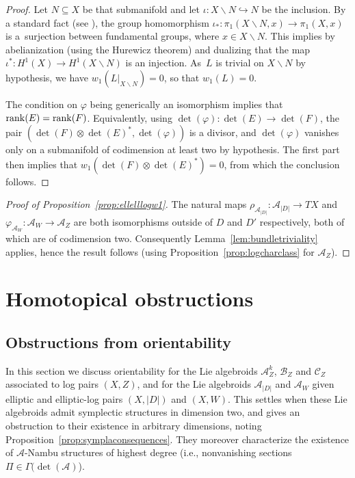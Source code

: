 \documentclass[10pt,a4paper]{amsart}
\numberwithin{equation}{section}
\begin{document}
\begin{proof} Let $N \subseteq X$ be that submanifold and let $\iota\colon X\backslash N \hookrightarrow N$ be the inclusion. By a standard fact (see \cite[Theorem~2.3, p.~146]{Godbillon71}), the group homomorphism $\iota_*\colon \pi_1(X\backslash N,x) \to \pi_1(X,x)$ is a~surjection between fundamental groups, where $x \in X \backslash N$. This implies by abelianization (using the Hurewicz theorem) and dualizing that the map $\iota^*\colon H^1(X) \to H^1(X\backslash N)$ is an injection. As~$L$ is trivial on $X \backslash N$ by hypothesis, we have $w_1(L|_{X\backslash N}) = 0$, so that $w_1(L) = 0$.

The condition on $\varphi$ being generically an isomorphism implies that ${\rm rank}(E) = {\rm rank}(F)$. Equivalently, using $\det(\varphi)\colon \det(E) \to \det(F)$, the pair $(\det(F) \otimes \det(E)^*, \det(\varphi))$ is a divisor, and $\det(\varphi)$ vanishes only on a submanifold of codimension at least two by hypothesis. The first part then implies that $w_1(\det(F) \otimes \det(E)^*) = 0$, from which the conclusion follows.
\end{proof}

\begin{proof}[Proof of Proposition~\ref{prop:ellelllogw1}] The natural maps $\rho_{\mathcal{A}_{|D|}}\colon \mathcal{A}_{|D|} \to TX$ and $\varphi_{\mathcal{A}_W}\colon \mathcal{A}_W \to \mathcal{A}_Z$ are both isomorphisms outside of $D$ and $D'$ respectively, both of which are of codimension two. Consequently Lemma~\ref{lem:bundletriviality} applies, hence the result follows (using Proposition~\ref{prop:logcharclass} for $\mathcal{A}_Z$).
\end{proof}

\section{Homotopical obstructions}

\subsection{Obstructions from orientability}\label{sec:existanambu}

In this section we discuss orientability for the Lie algebroids $\mathcal{A}_Z^k$, $\mathcal{B}_Z$ and $\mathcal{C}_Z$ associated to log pairs $(X,Z)$, and for the Lie algebroids $\mathcal{A}_{|D|}$ and $\mathcal{A}_W$ given elliptic and elliptic-log pairs $(X,|D|)$ and $(X,W)$. This settles when these Lie algebroids admit symplectic structures in dimension two, and gives an obstruction to their existence in arbitrary dimensions, noting Proposition~\ref{prop:symplaconsequences}. They moreover characterize the existence of $\mathcal{A}$-Nambu structures of highest degree (i.e., nonvanishing sections $\Pi \in \Gamma(\det(\mathcal{A})$).
\end{document}
